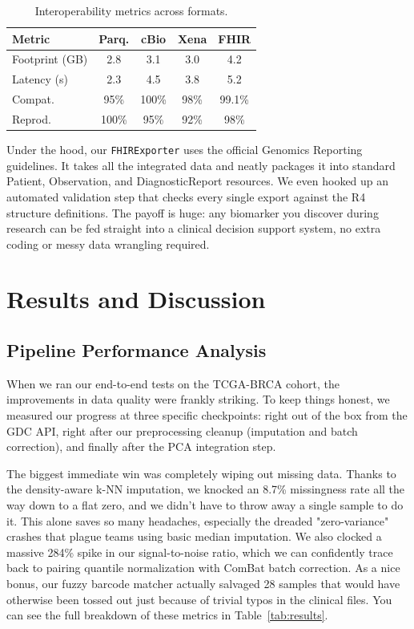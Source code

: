 \documentclass[runningheads]{llncs}
\begin{document}
\begin{table}[H]
\caption{Interoperability metrics across formats.}\label{tab:export}
\centering
\scriptsize
\setlength{\tabcolsep}{2pt}
\begin{tabular}{l c c c c}
\toprule
\textbf{Metric} & \textbf{Parq.} & \textbf{cBio} & \textbf{Xena} & \textbf{FHIR} \\
\midrule
Footprint (GB)      & 2.8   & 3.1   & 3.0   & 4.2 \\
Latency (s)         & 2.3   & 4.5   & 3.8   & 5.2 \\
Compat.             & 95\%  & 100\% & 98\%  & 99.1\% \\
Reprod.             & 100\% & 95\%  & 92\%  & 98\% \\
\bottomrule
\end{tabular}
\end{table}

Under the hood, our \texttt{FHIRExporter} uses the official Genomics Reporting guidelines. It takes all the integrated data and neatly packages it into standard Patient, Observation, and DiagnosticReport resources. We even hooked up an automated validation step that checks every single export against the R4 structure definitions. The payoff is huge: any biomarker you discover during research can be fed straight into a clinical decision support system, no extra coding or messy data wrangling required.

\section{Results and Discussion}

\subsection{Pipeline Performance Analysis}
When we ran our end-to-end tests on the TCGA-BRCA cohort, the improvements in data quality were frankly striking. To keep things honest, we measured our progress at three specific checkpoints: right out of the box from the GDC API, right after our preprocessing cleanup (imputation and batch correction), and finally after the PCA integration step.

The biggest immediate win was completely wiping out missing data. Thanks to the density-aware k-NN imputation, we knocked an 8.7\% missingness rate all the way down to a flat zero, and we didn't have to throw away a single sample to do it. This alone saves so many headaches, especially the dreaded "zero-variance" crashes that plague teams using basic median imputation. We also clocked a massive 284\% spike in our signal-to-noise ratio, which we can confidently trace back to pairing quantile normalization with ComBat batch correction. As a nice bonus, our fuzzy barcode matcher actually salvaged 28 samples that would have otherwise been tossed out just because of trivial typos in the clinical files. You can see the full breakdown of these metrics in Table~\ref{tab:results}.
\end{document}
